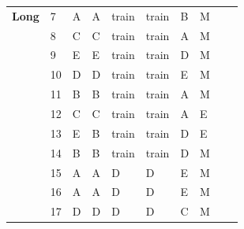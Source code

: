 \documentclass[pageno]{jpaper}
\begin{document}
\begin{table}[]
\begin{tabularx}{\textwidth}{XXXXXXXXXX}
\textbf{Long}            & 7               & A                       & A                      & train                   & train                   & B                       & M                   \\
\textbf{}                & 8               & C                       & C                      & train                   & train                   & A                       & M                   \\
\textbf{}                & 9               & E                       & E                      & train                   & train                   & D                       & M                   \\
\textbf{}                & 10              & D                       & D                      & train                   & train                   & E                       & M                   \\
\textbf{}                & 11              & B                       & B                      & train                   & train                   & A                       & M                   \\
\textbf{}                & 12              & C                       & C                      & train                   & train                   & A                       & E                   \\
\textbf{}                & 13              & E                       & B                      & train                   & train                   & D                       & E                   \\
\textbf{}                & 14              & B                       & B                      & train                   & train                   & D                       & M                   \\
\textbf{}                & 15              & A                       & A                      & D                       & D                       & E                       & M                   \\
\textbf{}                & 16              & A                       & A                      & D                       & D                       & E                       & M                   \\
\textbf{}                & 17              & D                       & D                      & D                       & D                       & C                       & M                   \\

\end{tabularx}
\end{table}
\end{document}
